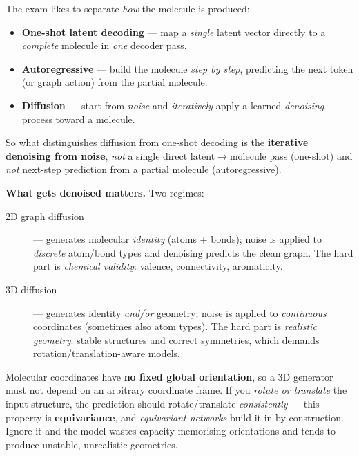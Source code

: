 \documentclass[11pt, oneside]{book}
\begin{document}
\begin{starbox}[title={\ensuremath{\bigstar}\, Three generation modes, contrasted}]
The exam likes to separate \emph{how} the molecule is produced:
\begin{itemize}
  \item \textbf{One-shot latent decoding} --- map a \emph{single} latent vector
        directly to a \emph{complete} molecule in \emph{one} decoder pass.
  \item \textbf{Autoregressive} --- build the molecule \emph{step by step}, predicting
        the next token (or graph action) from the partial molecule.
  \item \textbf{Diffusion} --- start from \emph{noise} and \emph{iteratively} apply a
        learned \emph{denoising} process toward a molecule.
\end{itemize}
So what distinguishes diffusion from one-shot decoding is the \textbf{iterative
denoising from noise}, \emph{not} a single direct latent$\to$molecule pass (one-shot)
and \emph{not} next-step prediction from a partial molecule (autoregressive).
\end{starbox}

\textbf{What gets denoised matters.} Two regimes:
\begin{description}
  \item[2D graph diffusion] --- generates molecular \emph{identity} (atoms + bonds);
        noise is applied to \emph{discrete} atom/bond types and denoising predicts the
        clean graph. The hard part is \emph{chemical validity}: valence, connectivity,
        aromaticity.
  \item[3D diffusion] --- generates identity \emph{and/or} geometry; noise is applied
        to \emph{continuous} coordinates (sometimes also atom types). The hard part is
        \emph{realistic geometry}: stable structures and correct symmetries, which
        demands rotation/translation-aware models.
\end{description}

\begin{starbox}[title={\ensuremath{\bigstar}\, 3D generation needs equivariance}]
Molecular coordinates have \textbf{no fixed global orientation}, so a 3D generator
must not depend on an arbitrary coordinate frame. If you \emph{rotate or translate}
the input structure, the prediction should rotate/translate \emph{consistently} ---
this property is \textbf{equivariance}, and \emph{equivariant networks} build it in by
construction. Ignore it and the model wastes capacity memorising orientations and
tends to produce unstable, unrealistic geometries.
\end{starbox}
\end{document}
